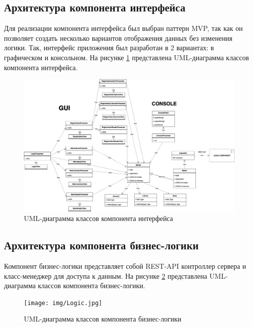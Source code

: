 \subsection{Архитектура компонента интерфейса}
Для реализации компонента интерфейса был выбран паттерн MVP, так как он позволяет создать несколько вариантов отображения данных без изменения логики. Так, интерфейс приложения был разработан в 2 вариантах: в графическом и консольном. На рисунке \ref{fig:ui} представлена UML-диаграмма классов компонента интерфейса.

\begin{figure}[H]
	\centering
	\includegraphics[width = \linewidth]{img/ui.jpg}
	\caption{UML-диаграмма классов компонента интерфейса}
	\label{fig:ui}
\end{figure}

\subsection{Архитектура компонента бизнес-логики}
Компонент бизнес-логики представляет собой REST-API контроллер сервера и класс-менеджер для доступа к данным. На рисунке \ref{fig:bl} представлена UML-диаграмма классов компонента бизнес-логики.

\begin{figure}[H]
	\centering
	\texttt{[image: img/Logiс.jpg]}
	\caption{UML-диаграмма классов компонента бизнес-логики}
	\label{fig:bl}
\end{figure}

